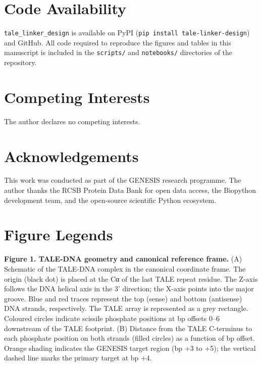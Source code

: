 \documentclass[11pt,a4paper]{article}
\newcommand{\pkg}{\texttt{tale\_linker\_design}}
\begin{document}
\section*{Code Availability}

\pkg{} is available on PyPI (\texttt{pip install tale-linker-design}) and GitHub.
All code required to reproduce the figures and tables in this manuscript is included
in the \texttt{scripts/} and \texttt{notebooks/} directories of the repository.

\section*{Competing Interests}

The author declares no competing interests.

\section*{Acknowledgements}

This work was conducted as part of the GENESIS research programme.
The author thanks the RCSB Protein Data Bank for open data access, the Biopython
development team, and the open-source scientific Python ecosystem.


\clearpage
\section*{Figure Legends}

\noindent\textbf{Figure 1. TALE-DNA geometry and canonical reference frame.}
(A) Schematic of the TALE-DNA complex in the canonical coordinate frame. The origin
(black dot) is placed at the Cα of the last TALE repeat residue. The Z-axis follows
the DNA helical axis in the 3' direction; the X-axis points into the major groove.
Blue and red traces represent the top (sense) and bottom (antisense) DNA strands,
respectively. The TALE array is represented as a grey rectangle. Coloured circles
indicate scissile phosphate positions at bp offsets 0--6 downstream of the TALE
footprint. (B) Distance from the TALE C-terminus to each phosphate position on both
strands (filled circles) as a function of bp offset. Orange shading indicates the
GENESIS target region (bp +3 to +5); the vertical dashed line marks the primary
target at bp +4.
\end{document}
